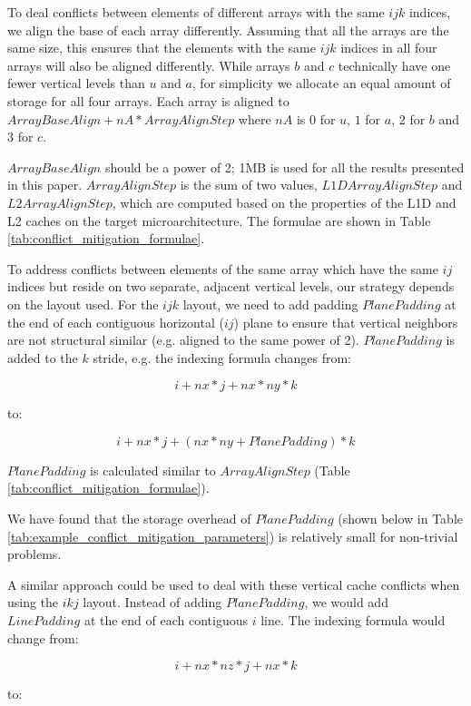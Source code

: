 \documentclass[conference]{IEEEtran}
\begin{document}
To deal conflicts between elements of different arrays with the same
\(ijk\) indices, we align the base of each array differently. Assuming that all
the arrays are the same size, this ensures that the elements with the same
\(ijk\) indices in all four arrays will also be aligned differently. While
arrays \(b\) and \(c\) technically have one fewer vertical levels than \(u\)
and \(a\), for simplicity we allocate an equal amount of storage for all four
arrays. Each array is aligned to \(ArrayBaseAlign+nA*ArrayAlignStep\)
where \(nA\) is \(0\) for \(u\), \(1\) for \(a\), \(2\) for \(b\) and \(3\) for
\(c\).

\(ArrayBaseAlign\) should be a power of 2; 1MB is used for all the results
presented in this paper. \(ArrayAlignStep\) is the sum of two values,
\(L1DArrayAlignStep\) and \(L2ArrayAlignStep\), which are computed based on the
properties of the L1D and L2 caches on the target microarchitecture. The formulae
are shown in Table \ref{tab:conflict_mitigation_formulae}. 

To address conflicts between elements of the same array which have the same
\(ij\) indices but reside on two separate, adjacent vertical levels, our
strategy depends on the layout used. For the \(ijk\) layout, we need to add
padding \(PlanePadding\) at the end of each contiguous horizontal (\(ij\))
plane to ensure that vertical neighbors are not structural similar (e.g.
aligned to the same power of 2). \(PlanePadding\) is added to the \(k\) stride,
e.g. the indexing formula changes from:

\[
i + nx * j + nx * ny * k
\]

\noindent to:

\[
i + nx * j + (nx * ny + PlanePadding) * k
\]

\noindent \(PlanePadding\) is calculated similar to \(ArrayAlignStep\) (Table \ref{tab:conflict_mitigation_formulae}).

We have found that the storage overhead of \(PlanePadding\) (shown below in
Table \ref{tab:example_conflict_mitigation_parameters}) is relatively small for
non-trivial problems. 

A similar approach could be used to deal with these vertical cache conflicts
when using the \(ikj\) layout. Instead of adding \(PlanePadding\), we would add
\(LinePadding\) at the end of each contiguous \(i\) line. The indexing formula
would change from:

\[
i + nx * nz * j + nx * k
\]

to:
\end{document}
